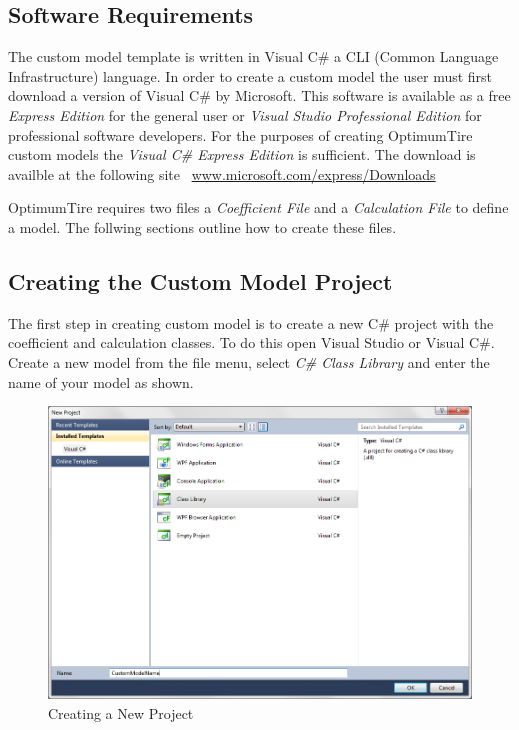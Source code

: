 \subsection{Software Requirements}
\label{sec:CustomModelsSoftwareRequirements}

The custom model template is written in Visual C\# a CLI (Common Language Infrastructure) language. In order to create a custom model the user must first download a version of Visual C\# by Microsoft. This software is available as a free \textsl{Express Edition} for the general user or \textsl{Visual Studio Professional Edition} for professional software developers. For the purposes of creating OptimumTire custom models the \textsl{Visual C\# Express Edition} is sufficient. The download is availble at the following site ~\href{http://www.microsoft.com/express/Downloads/#2010-Visual-CS}{www.microsoft.com/express/Downloads}

OptimumTire requires two files a \textsl{Coefficient File} and a \textsl{Calculation File} to define a model. The follwing sections outline how to create these files.

\subsection{Creating the Custom Model Project}
The first step in creating custom model is to create a new C\# project with the coefficient and calculation classes. To do this open Visual Studio or Visual C\#. Create a new model from the file menu, select \textsl{C\# Class Library} and enter the name of your model as shown.

 \begin{figure}[H]
	\centering
		\includegraphics[width=1.0\textwidth]{NewCustomModelProject.png}
	\caption{Creating a New Project}
	\label{fig:CreatingaNewProject}
\end{figure}

